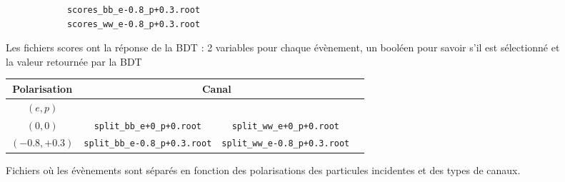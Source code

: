 
\begin{figure}[h!]
	\centering
	\begin{lstlisting}
			scores_bb_e-0.8_p+0.3.root
			scores_ww_e-0.8_p+0.3.root
	\end{lstlisting}
	\caption{Les fichiers scores ont la réponse de la BDT : 2 variables pour chaque évènement, un booléen pour savoir s'il est sélectionné et la valeur retournée par la BDT}
	\label{files:scores}
\end{figure}

\begin{figure}[h!]
	\centering
	\begin{tabular}{ | c | c | c | c | }
		\hline
		Polarisation & \multicolumn{2}{c|}{Canal} \\
		\hline
		$(e,p)$ & \bb &  \WW \\
		\hline
		$(0,0)$ & \verb|split_bb_e+0_p+0.root| & \verb|split_ww_e+0_p+0.root| \\
		\hline \cline{2-3}
		$(-0.8, +0.3)$ & \verb|split_bb_e-0.8_p+0.3.root| & \verb|split_ww_e-0.8_p+0.3.root| \\
		\hline
	\end{tabular}
	\label{files:split}
	\caption{Fichiers où les évènements sont séparés en fonction des polarisations des particules incidentes et des types de canaux.}
\end{figure}